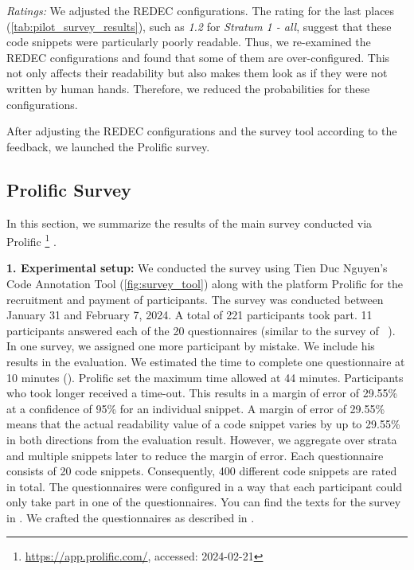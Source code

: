 \documentclass[%
class=scrreprt,
chapterprefix=false,%
open=right,%
twoside=true,%
paper=a4,%
logofile={Logo\_zentral\_farbig\_EN.png},%
thesistype=master,%
UKenglish,%
]{se2thesis}
\newcounter{urlfootnote}
\newcommand{\onecurl}[2]{%
	\stepcounter{urlfootnote}%
	\expandafter\def\csname urlfootnote:#1\endcsname{\theurlfootnote}%
	\footnote{\label{url:#1}\url{#1}, accessed: #2}%
}
\newcommand{\curl}[2]{%
		\onecurl{#1}{#2}%
}
\theoremstyle{definition}
\newcommand{\rdh}{REDEC\xspace}
\begin{document}
	\textit{Ratings:}
	We adjusted the \rdh configurations. The rating for the last places (\autoref{tab:pilot_survey_results}), such as \textit{1.2} for \textit{Stratum 1 - all}, suggest that these code snippets were particularly poorly readable. 
	Thus, we re-examined the \rdh configurations and found that some of them are over-configured. This not only affects their readability but also makes them look as if they were not written by human hands. Therefore, we reduced the probabilities for these configurations.
	
	After adjusting the \rdh configurations and the survey tool according to the feedback, we launched the Prolific survey.

\subsection{Prolific Survey} \label{Prolific Survey}
	In this section, we summarize the results of the main survey conducted via Prolific\curl{https://app.prolific.com/}{2024-02-21}.
		
\textbf{1. Experimental setup:}
	We conducted the survey using Tien Duc Nguyen's Code Annotation Tool (\autoref{fig:survey_tool}) along with the platform Prolific for the recruitment and payment of participants.
	The survey was conducted between January 31 and February 7, 2024. A total of 221 participants took part. 11 participants answered each of the 20 questionnaires (similar to the survey of \citeauthor{scalabrino2018comprehensive}~\cite{scalabrino2018comprehensive}). In one survey, we assigned one more participant by mistake. We include his results in the evaluation. We estimated the time to complete one questionnaire at 10 minutes (). Prolific set the maximum time allowed at 44 minutes. Participants who took longer received a time-out.
	This results in a margin of error of 29.55\% at a confidence of 95\% for an individual snippet.
	A margin of error of 29.55\% means that the actual readability value of a code snippet varies by up to 29.55\% in both directions from the evaluation result.
	However, we aggregate over strata and multiple snippets later to reduce the margin of error.
	Each questionnaire consists of 20 code snippets. Consequently, 400 different code snippets are rated in total. The questionnaires were configured in a way that each participant could only take part in one of the questionnaires. You can find the texts for the survey in . We crafted the questionnaires as described in .
		
\end{document}
